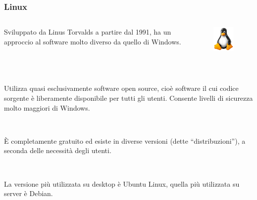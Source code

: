 \documentclass[]{beamer}
\begin{document}
\begin{frame}
\frametitle{Linux}
\begin{columns}
\begin{column}{.75\textwidth}
  Sviluppato da Linus Torvalds a partire dal 1991, ha un approccio al software molto diverso da quello di Windows.
\end{column}
\begin{column}{.15\textwidth}
  \begin{figure}
    \includegraphics[width=\columnwidth]{img/tux.png}
  \end{figure}\pause
\end{column}
\end{columns}

~

Utilizza quasi esclusivamente software \alert<2>{open source}, cioè software il cui codice sorgente è liberamente disponibile per tutti gli utenti. Consente livelli di sicurezza molto maggiori di Windows.\pause

~

È completamente gratuito ed esiste in diverse versioni (dette ``distribuzioni''), a seconda delle necessità degli utenti.\pause

~

La versione più utilizzata su desktop è \alert<4>{Ubuntu Linux}, quella più utilizzata su server è \alert<4>{Debian}.
\end{frame}
\end{document}
